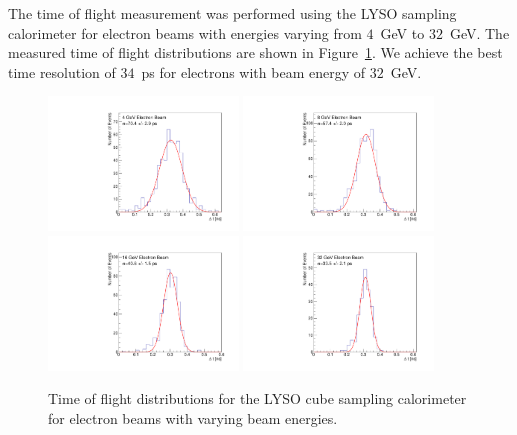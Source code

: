 \documentclass[12pt]{article}
\begin{document}
The time of flight measurement was performed using the LYSO sampling calorimeter
for electron beams with energies varying from $4$~GeV to $32$~GeV. The 
measured time of flight distributions are shown in Figure~\ref{fig:LYSOCubeTOF}.
We achieve the best time resolution of $34$~ps for electrons
with beam energy of $32$~GeV.

\begin{figure}[H] \centering
\includegraphics[width=0.45\textwidth]{figs/TOF_Electron_LYSOCube_4GeV} 
\includegraphics[width=0.45\textwidth]{figs/TOF_Electron_LYSOCube_8GeV} 
\includegraphics[width=0.45\textwidth]{figs/TOF_Electron_LYSOCube_16GeV} 
\includegraphics[width=0.45\textwidth]{figs/TOF_Electron_LYSOCube_32GeV} 
\caption{ Time of flight distributions for the LYSO cube sampling calorimeter
for electron beams with varying beam energies. } 
\label{fig:LYSOCubeTOF}
\end{figure}
\end{document}
